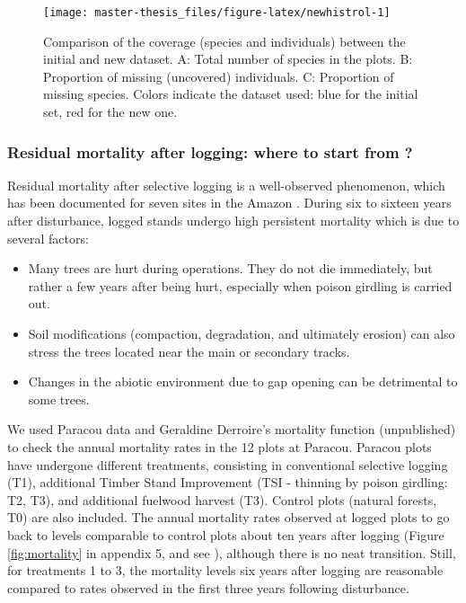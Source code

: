 \documentclass[12pt,]{article}
\providecommand{\tightlist}{%
\setlength{\itemsep}{0pt}\setlength{\parskip}{0pt}}
\theoremstyle{definition}
\theoremstyle{definition}
\theoremstyle{definition}
\theoremstyle{remark}
\begin{document}
\begin{figure}
\texttt{[image: master-thesis\_files/figure-latex/newhistrol-1]} \caption{Comparison of the coverage (species and individuals) between the initial and new dataset. A: Total number of species in the plots. B: Proportion of missing (uncovered) individuals. C: Proportion of missing species. Colors indicate the dataset used: blue for the initial set, red for the new one. }\label{fig:newhistrol}
\end{figure}

\subsubsection{Residual mortality after logging: where to start from
?}\label{residual-mortality-after-logging-where-to-start-from}

Residual mortality after selective logging is a well-observed
phenomenon, which has been documented for seven sites in the Amazon
\citep[five in Brazil, one in Suriname, and Paracou - see][ for a
summary table and references]{Blanc2009}. During six to sixteen years
after disturbance, logged stands undergo high persistent mortality which
is due to several factors:

\begin{itemize}
\tightlist
\item
  Many trees are hurt during operations. They do not die immediately,
  but rather a few years after being hurt, especially when poison
  girdling is carried out.
\item
  Soil modifications (compaction, degradation, and ultimately erosion)
  can also stress the trees located near the main or secondary tracks.
\item
  Changes in the abiotic environment due to gap opening can be
  detrimental to some trees.
\end{itemize}

We used Paracou data and Geraldine Derroire's mortality function
(unpublished) to check the annual mortality rates in the 12 plots at
Paracou. Paracou plots have undergone different treatments, consisting
in conventional selective logging (T1), additional Timber Stand
Improvement (TSI - thinning by poison girdling: T2, T3), and additional
fuelwood harvest (T3). Control plots (natural forests, T0) are also
included. The annual mortality rates observed at logged plots to go back
to levels comparable to control plots about ten years after logging
(Figure \ref{fig:mortality} in appendix 5, and see \citet{Blanc2009}),
although there is no neat transition. Still, for treatments 1 to 3, the
mortality levels six years after logging are reasonable compared to
rates observed in the first three years following disturbance.
\end{document}
